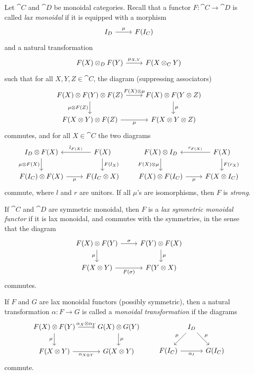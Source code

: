 \documentclass[12pt,oneside,article,draft]{memoir}
\begin{document}
Let $\cat{C}$ and $\cat{D}$ be monoidal categories. Recall that a functor
$F\colon\cat{C}\to\cat{D}$ is called \emph{lax monoidal} if it is equipped with a morphism
\[
\begin{tikzcd}
   I_D \rar{\mu} & F(I_C)
\end{tikzcd}
\]
and a natural transformation
\[
\begin{tikzcd}
   F(X) \otimes_D F(Y) \rar{\mu_{X,Y}} & F(X\otimes_C Y)
\end{tikzcd}
\]
such that for all $X,Y,Z\in\cat{C}$, the diagram (suppressing associators)
\[
\begin{tikzcd}
   F(X)\otimes F(Y) \otimes F(Z)
      \rar{F(X)\otimes\mu}
      \dar[swap]{\mu\otimes F(Z)}
   & F(X)\otimes F(Y\otimes Z)
      \dar{\mu} \\
   F(X\otimes Y)\otimes F(Z)
      \rar[swap]{\mu}
   & F(X\otimes Y\otimes Z)
\end{tikzcd}
\]
commutes, and for all $X\in\cat{C}$ the two diagrams
\[
\begin{tikzcd}
   I_D\otimes F(X)
      \dar[swap]{\mu\otimes F(X)}
   & F(X)
      \lar[swap]{l_{F(X)}}
      \dar{F(l_X)} \\
   F(I_C)\otimes F(X)
      \rar[swap]{\mu}
   & F(I_C\otimes X)
\end{tikzcd}
\qquad
\begin{tikzcd}
   F(X) \otimes I_D
      \dar[swap]{F(X)\otimes\mu}
   & F(X)
      \lar[swap]{r_{F(X)}}
      \dar{F(r_X)} \\
   F(X)\otimes F(I_C)
      \rar[swap]{\mu}
   & F(X\otimes I_C)
\end{tikzcd}
\]
commute, where $l$ and $r$ are unitors.
If all $\mu$'s are isomorphisms, then $F$ is \emph{strong}.

If $\cat{C}$ and $\cat{D}$ are symmetric monoidal, then $F$ is a \emph{lax symmetric monoidal
functor} if it is lax monoidal, and commutes with the symmetries, in the sense that the diagram
\[
\begin{tikzcd}
   F(X)\otimes F(Y)
      \rar{\sigma}
      \dar[swap]{\mu}
   & F(Y)\otimes F(X)
      \dar{\mu} \\
   F(X\otimes Y)
      \rar[swap]{F(\sigma)}
   & F(Y\otimes X)
\end{tikzcd}
\]
commutes.

If $F$ and $G$ are lax monoidal functors (possibly symmetric), then a natural transformation
$\alpha\colon F\to G$ is called a \emph{monoidal transformation} if the diagrams
\[
\begin{tikzcd}
   F(X)\otimes F(Y)
      \rar{\alpha_X\otimes\alpha_Y}
      \dar[swap]{\mu}
   & G(X)\otimes G(Y)
      \dar{\mu} \\
   F(X\otimes Y)
      \rar[swap]{\alpha_{X\otimes Y}}
   & G(X\otimes Y)
\end{tikzcd}
\qquad
\begin{tikzcd}[column sep=tiny]
   {} & I_D \dlar[swap]{\mu} \drar{\mu} & \\
   F(I_C) \ar{rr}[swap]{\alpha_I} && G(I_C)
\end{tikzcd}
\]
commute.
\end{document}
